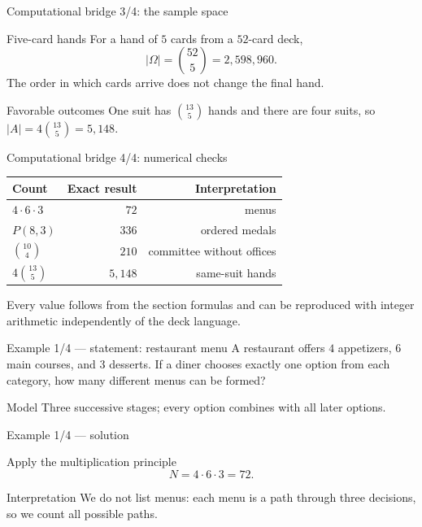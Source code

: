 \documentclass[10pt,aspectratio=169]{beamer}
\begin{document}
\begin{frame}{Computational bridge 3/4: the sample space}
  \small
  \begin{block}{Five-card hands}
    For a hand of $5$ cards from a $52$-card deck,
    \[
      \lvert\Omega\rvert=\binom{52}{5}=2{,}598{,}960.
    \]
    The order in which cards arrive does not change the final hand.
  \end{block}
  \pause
  \begin{alertblock}{Favorable outcomes}
    One suit has $\binom{13}{5}$ hands and there are four suits, so
    $\lvert A\rvert=4\binom{13}{5}=5{,}148$.
  \end{alertblock}
\end{frame}

\begin{frame}{Computational bridge 4/4: numerical checks}
  \scriptsize
  \begin{center}
    \begin{tabular}{lrr}
      \hline
      Count & Exact result & Interpretation \\
      \hline
      $4\cdot6\cdot3$ & $72$ & menus \\
      $P(8,3)$ & $336$ & ordered medals \\
      $\binom{10}{4}$ & $210$ & committee without offices \\
      $4\binom{13}{5}$ & $5{,}148$ & same-suit hands \\
      \hline
    \end{tabular}
  \end{center}
  \vspace{0.1cm}
  Every value follows from the section formulas and can be reproduced with
  integer arithmetic independently of the deck language.
\end{frame}

\begin{frame}{Example 1/4 --- statement: restaurant menu}
  \small
  A restaurant offers $4$ appetizers, $6$ main courses, and $3$ desserts.
  If a diner chooses exactly one option from each category, how many different
  menus can be formed?
  \vfill
  \begin{alertblock}{Model}
    Three successive stages; every option combines with all later options.
  \end{alertblock}
\end{frame}

\begin{frame}{Example 1/4 --- solution}
  \small
  \begin{block}{Apply the multiplication principle}
    \[
      N=4\cdot6\cdot3=72.
    \]
  \end{block}
  \begin{exampleblock}{Interpretation}
    We do not list menus: each menu is a path through three decisions, so we
    count all possible paths.
  \end{exampleblock}
\end{frame}
\end{document}
